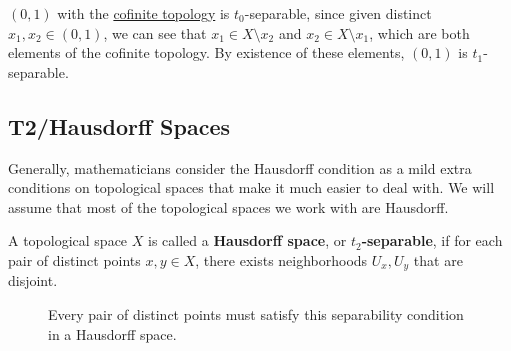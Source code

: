   \begin{example}[Cofinite is $t_1$]
    \label{ex:cofinite-is-t1}
    $(0,1)$ with the \hyperref[def:cofinite-topology]{cofinite topology} is $t_0$-separable, since given distinct $x_1, x_2 \in (0,1)$, we can see that $x_1 \in X \setminus {x_2}$ and $x_2 \in X \setminus {x_1}$, which are both elements of the cofinite topology. By existence of these elements, $(0,1)$ is $t_1$-separable. 
  \end{example}

\subsection{T2/Hausdorff Spaces}

  Generally, mathematicians consider the Hausdorff condition as a mild extra conditions on topological spaces that make it much easier to deal with. We will assume that most of the topological spaces we work with are Hausdorff. 

  \begin{definition}
    \label{def:hausdorff-space}
    A topological space $X$ is called a \textbf{Hausdorff space}, or \textbf{$t_2$-separable}, if for each pair of distinct points $x, y \in X$, there exists neighborhoods $U_x, U_y$ that are disjoint.

    \begin{figure}[H]
      \centering 
      \caption{Every pair of distinct points must satisfy this separability condition in a Hausdorff space.} 
      \label{fig:hausdorff}
    \end{figure}
  \end{definition}

